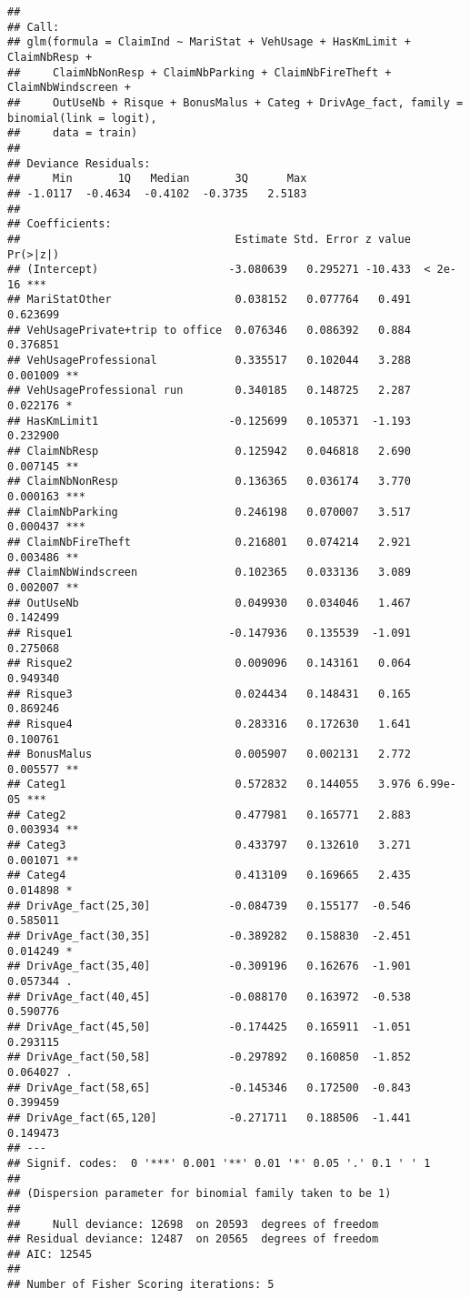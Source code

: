 \documentclass[
]{article}
\begin{document}
\begin{verbatim}
## 
## Call:
## glm(formula = ClaimInd ~ MariStat + VehUsage + HasKmLimit + ClaimNbResp + 
##     ClaimNbNonResp + ClaimNbParking + ClaimNbFireTheft + ClaimNbWindscreen + 
##     OutUseNb + Risque + BonusMalus + Categ + DrivAge_fact, family = binomial(link = logit), 
##     data = train)
## 
## Deviance Residuals: 
##     Min       1Q   Median       3Q      Max  
## -1.0117  -0.4634  -0.4102  -0.3735   2.5183  
## 
## Coefficients:
##                                 Estimate Std. Error z value Pr(>|z|)    
## (Intercept)                    -3.080639   0.295271 -10.433  < 2e-16 ***
## MariStatOther                   0.038152   0.077764   0.491 0.623699    
## VehUsagePrivate+trip to office  0.076346   0.086392   0.884 0.376851    
## VehUsageProfessional            0.335517   0.102044   3.288 0.001009 ** 
## VehUsageProfessional run        0.340185   0.148725   2.287 0.022176 *  
## HasKmLimit1                    -0.125699   0.105371  -1.193 0.232900    
## ClaimNbResp                     0.125942   0.046818   2.690 0.007145 ** 
## ClaimNbNonResp                  0.136365   0.036174   3.770 0.000163 ***
## ClaimNbParking                  0.246198   0.070007   3.517 0.000437 ***
## ClaimNbFireTheft                0.216801   0.074214   2.921 0.003486 ** 
## ClaimNbWindscreen               0.102365   0.033136   3.089 0.002007 ** 
## OutUseNb                        0.049930   0.034046   1.467 0.142499    
## Risque1                        -0.147936   0.135539  -1.091 0.275068    
## Risque2                         0.009096   0.143161   0.064 0.949340    
## Risque3                         0.024434   0.148431   0.165 0.869246    
## Risque4                         0.283316   0.172630   1.641 0.100761    
## BonusMalus                      0.005907   0.002131   2.772 0.005577 ** 
## Categ1                          0.572832   0.144055   3.976 6.99e-05 ***
## Categ2                          0.477981   0.165771   2.883 0.003934 ** 
## Categ3                          0.433797   0.132610   3.271 0.001071 ** 
## Categ4                          0.413109   0.169665   2.435 0.014898 *  
## DrivAge_fact(25,30]            -0.084739   0.155177  -0.546 0.585011    
## DrivAge_fact(30,35]            -0.389282   0.158830  -2.451 0.014249 *  
## DrivAge_fact(35,40]            -0.309196   0.162676  -1.901 0.057344 .  
## DrivAge_fact(40,45]            -0.088170   0.163972  -0.538 0.590776    
## DrivAge_fact(45,50]            -0.174425   0.165911  -1.051 0.293115    
## DrivAge_fact(50,58]            -0.297892   0.160850  -1.852 0.064027 .  
## DrivAge_fact(58,65]            -0.145346   0.172500  -0.843 0.399459    
## DrivAge_fact(65,120]           -0.271711   0.188506  -1.441 0.149473    
## ---
## Signif. codes:  0 '***' 0.001 '**' 0.01 '*' 0.05 '.' 0.1 ' ' 1
## 
## (Dispersion parameter for binomial family taken to be 1)
## 
##     Null deviance: 12698  on 20593  degrees of freedom
## Residual deviance: 12487  on 20565  degrees of freedom
## AIC: 12545
## 
## Number of Fisher Scoring iterations: 5
\end{verbatim}
\end{document}
